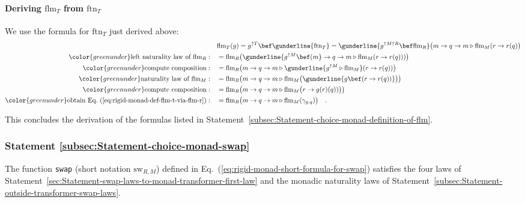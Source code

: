 \paragraph{Deriving $\text{flm}_{T}$ from $\text{ftn}_{T}$}

We use the formula for $\text{ftn}_{T}$ just derived above:
\begin{align*}
 & \text{flm}_{T}(g)=g^{\uparrow T}\bef\gunderline{\text{ftn}_{T}}=\gunderline{g^{\uparrow M\uparrow R}\bef\text{flm}_{R}}\big(m\rightarrow q\rightarrow m\triangleright\text{flm}_{M}(r\rightarrow r(q)\big)\\
{\color{greenunder}\text{left naturality law of }\text{flm}_{R}:}\quad & =\text{flm}_{R}\big(\gunderline{g^{\uparrow M}\bef(m}\rightarrow q\rightarrow m\triangleright\text{flm}_{M}(r\rightarrow r(q)))\big)\\
{\color{greenunder}\text{compute composition}:}\quad & =\text{flm}_{R}\big(m\rightarrow q\rightarrow m\triangleright\gunderline{g^{\uparrow M}\triangleright\text{flm}_{M}}(r\rightarrow r(q))\big)\\
{\color{greenunder}\text{naturality law of }\text{flm}_{M}:}\quad & =\text{flm}_{R}\big(m\rightarrow q\rightarrow m\triangleright\text{flm}_{M}\big(\gunderline{g\bef(r\rightarrow r(q))}\big)\big)\\
{\color{greenunder}\text{compute composition}:}\quad & =\text{flm}_{R}\big(m\rightarrow q\rightarrow m\triangleright\text{flm}_{M}\big(r\rightarrow g(r)(q))\big)\big)\\
{\color{greenunder}\text{obtain Eq.~(\ref{eq:rigid-monad-def-flm-t-via-flm-r})}:}\quad & =\text{flm}_{R}\big(m\rightarrow q\rightarrow m\triangleright\text{flm}_{M}(\gamma_{g,q})\big)\quad.
\end{align*}

This concludes the derivation of the formulas listed in Statement~\ref{subsec:Statement-choice-monad-definition-of-flm}.

\subsubsection{Statement \label{subsec:Statement-choice-monad-swap}\ref{subsec:Statement-choice-monad-swap}}

The function \lstinline!swap! (short notation $\text{sw}_{R,M}$)
defined in Eq.~(\ref{eq:rigid-monad-short-formula-for-swap}) satisfies
the four laws of Statement~\ref{sec:Statement-swap-laws-to-monad-transformer-first-law}
and the monadic naturality laws of Statement~\ref{subsec:Statement-outside-transformer-swap-laws}.

